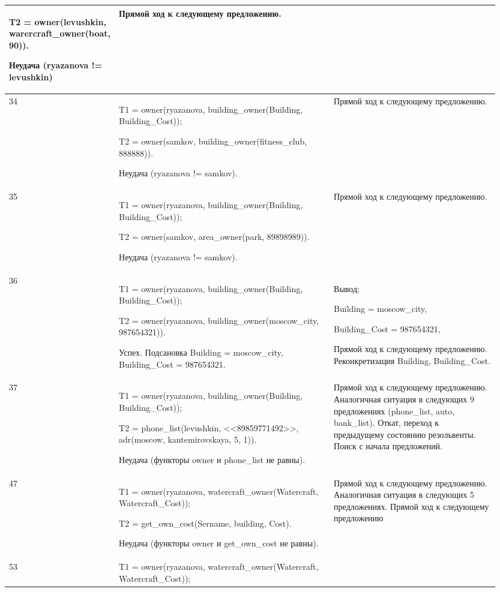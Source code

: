 \documentclass[a4paper,12pt]{article}
\begin{document}
\begin{center}
\begin{longtable}[h!]{|p{0.05\linewidth}|p{0.5\linewidth}|p{ 0.4\linewidth}|}
{				T2 =  owner(levushkin, warercraft\_owner(boat, 90)).
				
				Неудача (ryazanova != levushkin)} & {Прямой ход к следующему предложению.}\\
			\hline
			{34} & {T1 = owner(ryazanova, building\_owner(Building, Building\_Cost));
				
				T2 =  owner(samkov, building\_owner(fitness\_club, 888888)).
				
				Неудача (ryazanova != samkov).} & {Прямой ход к следующему предложению.}\\
			\hline
			{35} & {T1 = owner(ryazanova, building\_owner(Building, Building\_Cost));
				
				T2 =  owner(samkov, area\_owner(park, 89898989)).
				
				Неудача (ryazanova != samkov).} & {Прямой ход к следующему предложению.}\\
			\hline
			{36} & {T1 = owner(ryazanova, building\_owner(Building, Building\_Cost));
				
				T2 =  owner(ryazanova, building\_owner(moscow\_city, 987654321)).
				
				Успех. Подсановка Building = moscow\_city, Building\_Cost = 987654321.} & {Вывод:
				
				Building = moscow\_city,
				
				Building\_Cost = 987654321,
				
				Прямой ход к следующему предложению. Реконкретизация Building, Building\_Cost.}\\
			\hline
			{37} & {T1 = owner(ryazanova, building\_owner(Building, Building\_Cost));
				
				T2 =  phone\_list(levushkin, <<89859771492>>, adr(moscow, kantemirovskaya, 5, 1)).
				
				Неудача (функторы owner и phone\_list не равны).} & {Прямой ход к следующему предложению. Аналогичная ситуация в следующих 9 предложениях (phone\_list, auto, bank\_list). Откат, переход к предыдущему состоянию резольвенты. Поиск с начала предложений.}\\
			\hline
			{47} & {T1 = owner(ryazanova, watercraft\_owner(Watercraft, Watercraft\_Cost));
			
		T2 = get\_own\_cost(Sername, building, Cost).
	
Неудача (функторы owner и get\_own\_cost не равны).} & {Прямой ход к следующему предложению. Аналогичная ситуация в следующих 5 предложениях. Прямой ход к следующему предложению}\\
						\hline
			{53} & {T1 = owner(ryazanova, watercraft\_owner(Watercraft, Watercraft\_Cost));
				
}
\end{longtable}
\end{center}
\end{document}

